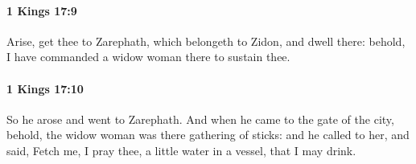		\paragraph{1 Kings 17:9} %
			\label{1KINGS-17-9}

			Arise, get thee to Zarephath, which belongeth to Zidon, and dwell there: behold, I have commanded a widow woman there to sustain thee.


		\paragraph{1 Kings 17:10} %
			\label{1KINGS-17-10}

			So he arose and went to Zarephath. And when he came to the gate of the city, behold, the widow woman was there gathering of sticks: and he called to her, and said, Fetch me, I pray thee, a little water in a vessel, that I may drink.


